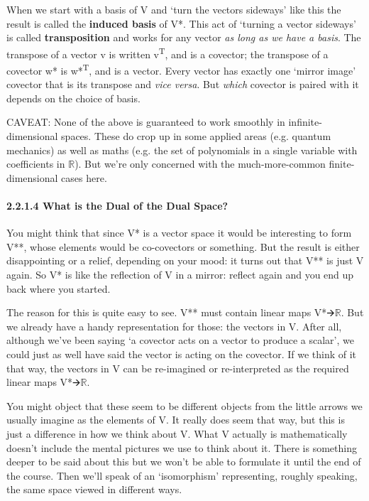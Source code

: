 \documentclass[oneside,english]{amsbook}
\numberwithin{section}{chapter}
\theoremstyle{plain}
\theoremstyle{definition}
\begin{document}
When we start with a basis of V and `turn the vectors sideways' like
this the result is called the \textbf{induced basis} of V*. This act of
`turning a vector sideways' is called \textbf{transposition} and works
for any vector \emph{as long as we have a basis}. The transpose of a
vector v is written v\textsuperscript{T}, and is a covector; the
transpose of a covector w* is w*\textsuperscript{T}, and is a vector.
Every vector has exactly one `mirror image' covector that is its
transpose and \emph{vice versa}. But \emph{which} covector is paired
with it depends on the choice of basis.

CAVEAT: None of the above is guaranteed to work smoothly in
infinite-dimensional spaces. These do crop up in some applied areas
(e.g. quantum mechanics) as well as maths (e.g. the set of polynomials
in a single variable with coefficients in $\mathbb{R}$). But we're only
concerned with the much-more-common finite-dimensional cases here.

\paragraph{2.2.1.4 What is the Dual of the Dual
	Space?}\label{what-is-the-dual-of-the-dual-space}

You might think that since V* is a vector space it would be interesting
to form V**, whose elements would be co-covectors or something. But the
result is either disappointing or a relief, depending on your mood: it
turns out that V** is just V again. So V* is like the reflection of V in
a mirror: reflect again and you end up back where you started.

The reason for this is quite easy to see. V** must contain linear maps
V*🡪$\mathbb{R}$. But we already have a handy representation for those: the
vectors in V. After all, although we've been saying `a covector acts on
a vector to produce a scalar', we could just as well have said the
vector is acting on the covector. If we think of it that way, the
vectors in V can be re-imagined or re-interpreted as the required linear
maps V*🡪$\mathbb{R}$.

You might object that these seem to be different objects from the little
arrows we usually imagine as the elements of V. It really does seem that
way, but this is just a difference in how we think about V. What V
actually is mathematically doesn't include the mental pictures we use to
think about it. There is something deeper to be said about this but we
won't be able to formulate it until the end of the course. Then we'll
speak of an `isomorphism' representing, roughly speaking, the same
space viewed in different ways.
\end{document}
